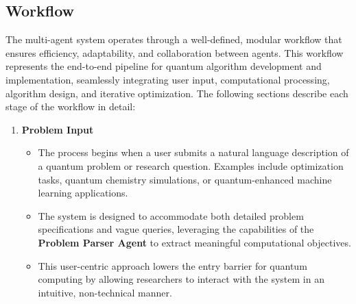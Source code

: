 \documentclass[12pt]{article}
\begin{document}
\subsection{Workflow}
The multi-agent system operates through a well-defined, modular workflow that ensures efficiency, adaptability, and collaboration between agents. This workflow represents the end-to-end pipeline for quantum algorithm development and implementation, seamlessly integrating user input, computational processing, algorithm design, and iterative optimization. The following sections describe each stage of the workflow in detail:

\begin{enumerate}
    \item \textbf{Problem Input}
    \begin{itemize}
        \item The process begins when a user submits a natural language description of a quantum problem or research question. Examples include optimization tasks, quantum chemistry simulations, or quantum-enhanced machine learning applications.
        \item The system is designed to accommodate both detailed problem specifications and vague queries, leveraging the capabilities of the \textbf{Problem Parser Agent} to extract meaningful computational objectives.
        \item This user-centric approach lowers the entry barrier for quantum computing by allowing researchers to interact with the system in an intuitive, non-technical manner.
    \end{itemize}


\end{enumerate}
\end{document}
